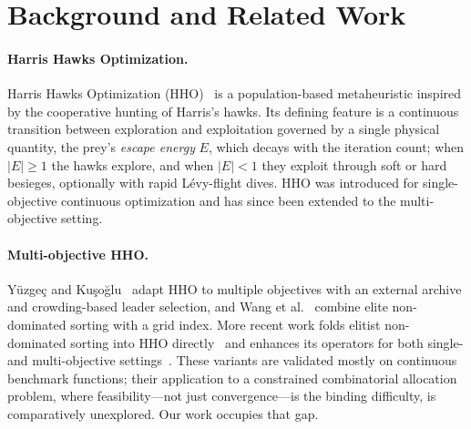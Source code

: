 \documentclass[runningheads]{llncs}
\begin{document}
\section{Background and Related Work}
\label{sec:related}

\paragraph{Harris Hawks Optimization.}
Harris Hawks Optimization (HHO)~\cite{heidari} is a population-based metaheuristic inspired by the cooperative hunting of Harris's hawks. Its defining feature is a continuous transition between exploration and exploitation governed by a single physical quantity, the prey's \emph{escape energy} $E$, which decays with the iteration count; when $|E|\!\ge\!1$ the hawks explore, and when $|E|\!<\!1$ they exploit through soft or hard besieges, optionally with rapid Lévy-flight dives. HHO was introduced for single-objective continuous optimization and has since been extended to the multi-objective setting.

\paragraph{Multi-objective HHO.}
Yüzgeç and Kuşoğlu~\cite{kusoglu} adapt HHO to multiple objectives with an external archive and crowding-based leader selection, and Wang et al.~\cite{cerci} combine elite non-dominated sorting with a grid index. More recent work folds elitist non-dominated sorting into HHO directly~\cite{jangir} and enhances its operators for both single- and multi-objective settings~\cite{choo}. These variants are validated mostly on continuous benchmark functions; their application to a constrained combinatorial allocation problem, where feasibility---not just convergence---is the binding difficulty, is comparatively unexplored. Our work occupies that gap.
\end{document}

